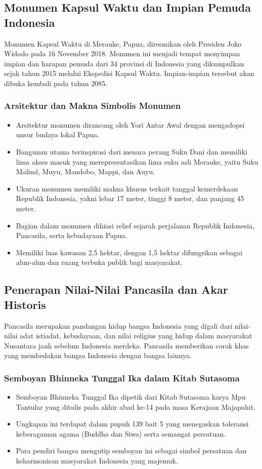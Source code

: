 \subsection{Monumen Kapsul Waktu dan Impian Pemuda Indonesia}

Monumen Kapsul Waktu di Merauke, Papua, diresmikan oleh Presiden Joko Widodo pada 16 November 2018. Monumen ini menjadi tempat menyimpan impian dan harapan pemuda dari 34 provinsi di Indonesia yang dikumpulkan sejak tahun 2015 melalui Ekspedisi Kapsul Waktu. Impian-impian tersebut akan dibuka kembali pada tahun 2085.

\subsubsection{Arsitektur dan Makna Simbolis Monumen}
\begin{itemize}
\item Arsitektur monumen dirancang oleh Yori Antar Awal dengan mengadopsi unsur budaya lokal Papua.
\item Bangunan utama terinspirasi dari menara perang Suku Dani dan memiliki lima akses masuk yang merepresentasikan lima suku asli Merauke, yaitu Suku Malind, Muyu, Mandobo, Mappi, dan Auyu.
\item Ukuran monumen memiliki makna khusus terkait tanggal kemerdekaan Republik Indonesia, yakni lebar 17 meter, tinggi 8 meter, dan panjang 45 meter.
\item Bagian dalam monumen dihiasi relief sejarah perjalanan Republik Indonesia, Pancasila, serta kebudayaan Papua.
\item Memiliki luas kawasan 2,5 hektar, dengan 1,5 hektar difungsikan sebagai alun-alun dan ruang terbuka publik bagi masyarakat.
\end{itemize}

\subsection{Penerapan Nilai-Nilai Pancasila dan Akar Historis}

Pancasila merupakan pandangan hidup bangsa Indonesia yang digali dari nilai-nilai adat istiadat, kebudayaan, dan nilai religius yang hidup dalam masyarakat Nusantara jauh sebelum Indonesia merdeka. Pancasila memberikan corak khas yang membedakan bangsa Indonesia dengan bangsa lainnya.

\subsubsection{Semboyan Bhinneka Tunggal Ika dalam Kitab Sutasoma}
\begin{itemize}
\item Semboyan Bhinneka Tunggal Ika dipetik dari Kitab Sutasoma karya Mpu Tantular yang ditulis pada akhir abad ke-14 pada masa Kerajaan Majapahit.
\item Ungkapan ini terdapat dalam pupuh 139 bait 5 yang menegaskan toleransi keberagaman agama (Buddha dan Siwa) serta semangat persatuan.
\item Para pendiri bangsa mengutip semboyan ini sebagai simbol persatuan dan keharmonisan masyarakat Indonesia yang majemuk.
\end{itemize}

